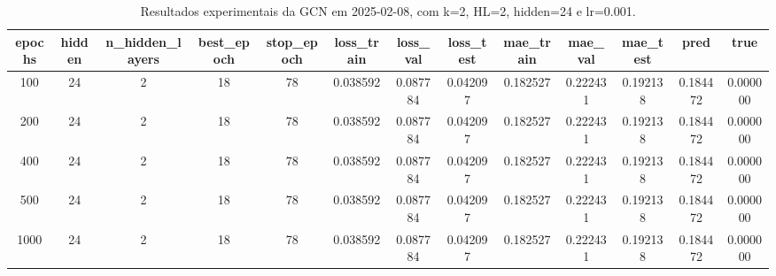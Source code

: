 \begin{table}[h]
\centering
\caption{Resultados experimentais da GCN em 2025-02-08, com k=2, HL=2, hidden=24 e lr=0.001.}
\label{tab:gcn_results_k2_hl2_h24_d20250208}
\begin{tabular}{ccccccccccccc}
\toprule
epochs & hidden & n\_hidden\_layers & best\_epoch & stop\_epoch & loss\_train & loss\_val & loss\_test & mae\_train & mae\_val & mae\_test & pred & true \\
\midrule
100 & 24 & 2 & 18 & 78 & 0.038592 & 0.087784 & 0.042097 & 0.182527 & 0.222431 & 0.192138 & 0.184472 & 0.000000 \\
200 & 24 & 2 & 18 & 78 & 0.038592 & 0.087784 & 0.042097 & 0.182527 & 0.222431 & 0.192138 & 0.184472 & 0.000000 \\
400 & 24 & 2 & 18 & 78 & 0.038592 & 0.087784 & 0.042097 & 0.182527 & 0.222431 & 0.192138 & 0.184472 & 0.000000 \\
500 & 24 & 2 & 18 & 78 & 0.038592 & 0.087784 & 0.042097 & 0.182527 & 0.222431 & 0.192138 & 0.184472 & 0.000000 \\
1000 & 24 & 2 & 18 & 78 & 0.038592 & 0.087784 & 0.042097 & 0.182527 & 0.222431 & 0.192138 & 0.184472 & 0.000000 \\
\bottomrule
\end{tabular}
\end{table}

